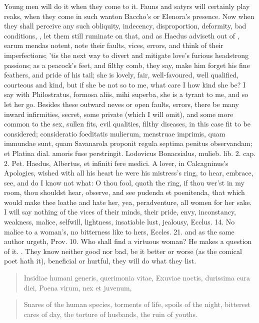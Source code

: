 Young men will do it when they come to it. Fauns and satyrs will
certainly play reaks, when they come in such wanton Baccho's or
Elenora's presence. Now when they shall perceive any such obliquity,
indecency, disproportion, deformity, bad conditions, \etc{}, let them
still ruminate on that, and as Haedus adviseth out of \Ovid, earum
mendas notent, note their faults, vices, errors, and think of their
imperfections; 'tis the next way to divert and mitigate love's furious
headstrong passions; as a peacock's feet, and filthy comb, they say,
make him forget his fine feathers, and pride of his tail; she is
lovely, fair, well-favoured, well qualified, courteous and kind, but if
she be not so to me, what care I how kind she be? I say with
Philostratus, formosa aliis, mihi superba, she is a tyrant to me,
and so let her go. Besides these outward neves or open faults, errors,
there be many inward infirmities, secret, some private (which I will
omit), and some more common to the sex, sullen fits, evil qualities,
filthy diseases, in this case fit to be considered; consideratio
foeditatis mulierum, menstruae imprimis, quam immundae sunt, quam
Savanarola proponit regula septima penitus observandam; et Platina
dial. amoris fuse perstringit. Lodovicus Bonacsialus, mulieb. lib. 2.
cap. 2. Pet. Haedus, Albertus, et infiniti fere medici. A lover,
in Calcagninus's Apologies, wished with all his heart he were his
mistress's ring, to hear, embrace, see, and do I know not what: O thou
fool, quoth the ring, if thou wer'st in my room, thou shouldst hear,
observe, and see pudenda et poenitenda, that which would make thee
loathe and hate her, yea, peradventure, all women for her sake.
I will say nothing of the vices of their minds, their pride, envy,
inconstancy, weakness, malice, selfwill, lightness, insatiable lust,
jealousy, Ecclus.  14. No malice to a woman's, no bitterness like to
hers, Eccles.  21. and as the same author urgeth, Prov.  10.
Who shall find a virtuous woman? He makes a question of it. . They know neither good nor bad, be
it better or worse (as the comical poet hath it), beneficial or
hurtful, they will do what they list.

\begin{latin}
\begin{verse}
Insidiae humani generis, querimonia vitae,
Exuviae noctis, durissima cura diei,
Poena virum, nex et juvenum,
\end{verse}
\end{latin}%
\begin{verse}%
Snares of the human species, torments of life,
spoils of the night, bitterest cares of day,
the torture of husbands, the ruin of youths.
\end{verse}%

